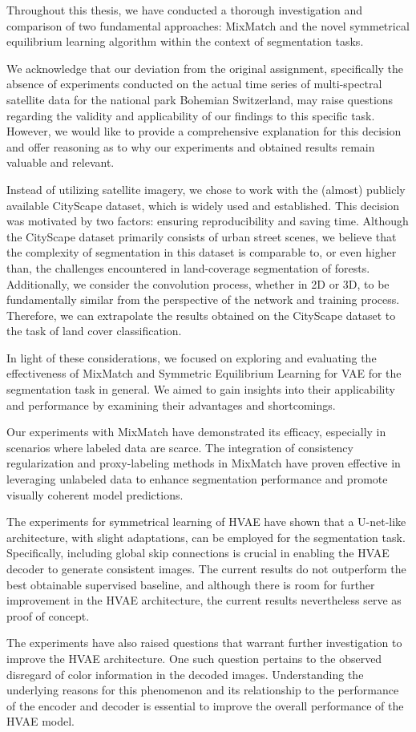 Throughout this thesis, we have conducted a thorough investigation and comparison of two fundamental approaches: MixMatch
and the novel symmetrical equilibrium learning algorithm within the context of segmentation tasks.

We acknowledge that our deviation from the original assignment, specifically the absence of experiments conducted on the actual 
time series of multi-spectral satellite data for the national park Bohemian Switzerland, may raise questions regarding the validity 
and applicability of our findings to this specific task. However, we would like to provide a comprehensive explanation for this 
decision and offer reasoning as to why our experiments and obtained results remain valuable and relevant.

Instead of utilizing satellite imagery, we chose to work with the (almost) publicly available CityScape dataset, which is widely
used and established. This decision was motivated by two factors: ensuring reproducibility and saving time. Although the CityScape 
dataset primarily consists of urban street scenes, we believe that the complexity of segmentation in this dataset is comparable to, or
even higher than, the challenges encountered in land-coverage segmentation of forests. Additionally, we consider the convolution 
process, whether in 2D or 3D, to be fundamentally similar from the perspective of the network and training process. Therefore, we 
can extrapolate the results obtained on the CityScape dataset to the task of land cover classification.

In light of these considerations, we focused on exploring and evaluating the effectiveness of MixMatch and Symmetric
Equilibrium Learning for VAE for the segmentation task in general. We aimed to gain insights into their applicability 
and performance by examining their advantages and shortcomings.

Our experiments with MixMatch have demonstrated its efficacy, especially in scenarios where labeled data are scarce. The integration of 
consistency regularization and proxy-labeling methods in MixMatch have proven effective in leveraging unlabeled data to enhance segmentation
performance and promote visually coherent model predictions.

The experiments for symmetrical learning of HVAE have shown that a U-net-like architecture, with slight adaptations, can be employed 
for the segmentation task. Specifically, including global skip connections is crucial in enabling the HVAE decoder to generate consistent images. 
The current results do not outperform the best obtainable supervised baseline, and although there is room for further improvement in the HVAE 
architecture, the current results nevertheless serve as proof of concept. 

The experiments have also raised questions that warrant further investigation to improve the HVAE architecture.
One such question pertains to the observed disregard of color information in the decoded images. Understanding the underlying reasons for 
this phenomenon and its relationship to the performance of the encoder and decoder is essential to improve the overall performance of the HVAE model.